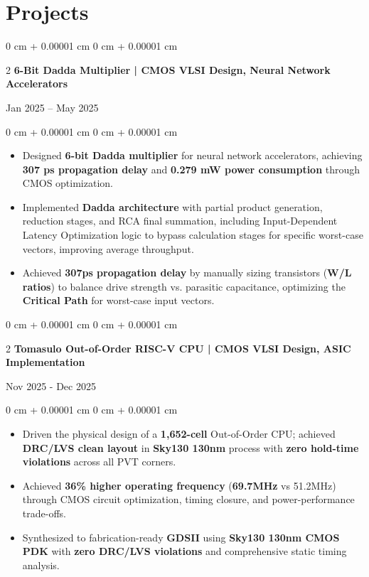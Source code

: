 \documentclass[10pt, letterpaper]{article}
\newenvironment{highlights}{
    \begin{itemize}[
        topsep=0.05 cm,
        parsep=0.05 cm,
        partopsep=0pt,
        itemsep=0pt,
        leftmargin=0 cm + 10pt
    ]
}{
    \end{itemize}
}
\newenvironment{onecolentry}{
    \begin{adjustwidth}{
        0 cm + 0.00001 cm
    }{
        0 cm + 0.00001 cm
    }
}{
    \end{adjustwidth}
}
\newenvironment{twocolentry}[2][]{
    \onecolentry
    \def\secondColumn{#2}
    \setcolumnwidth{\fill, 4.5 cm}
    \begin{paracol}{2}
}{
    \switchcolumn \raggedleft \secondColumn
    \end{paracol}
    \endonecolentry
}
\begin{document}
    \section{Projects}

        \begin{twocolentry}{
            Jan 2025 – May 2025 } \textbf{6-Bit Dadda Multiplier | CMOS VLSI Design, Neural Network Accelerators}
        \end{twocolentry}
        \vspace{0.05 cm}
        \begin{onecolentry}
            \begin{highlights}
                \item Designed \textbf{6-bit Dadda multiplier} for neural network accelerators, achieving \textbf{307 ps propagation delay} and \textbf{0.279 mW power consumption} through CMOS optimization.
                \item Implemented \textbf{Dadda architecture} with partial product generation, reduction stages, and RCA final summation, including Input-Dependent Latency Optimization logic to bypass calculation stages for specific worst-case vectors, improving average throughput.
                \item Achieved \textbf{307ps propagation delay} by manually sizing transistors (\textbf{W/L ratios}) to balance drive strength vs. parasitic capacitance, optimizing the \textbf{Critical Path} for worst-case input vectors.
            \end{highlights}
        \end{onecolentry}

        \vspace{0.10 cm}
        \begin{twocolentry}{
            Nov 2025 - Dec 2025 } \textbf{Tomasulo Out-of-Order RISC-V CPU | CMOS VLSI Design, ASIC Implementation}
        \end{twocolentry}
        \vspace{0.05 cm}
        \begin{onecolentry}
            \begin{highlights}
                \item Driven the physical design of a \textbf{1,652-cell} Out-of-Order CPU; achieved \textbf{DRC/LVS clean layout} in \textbf{Sky130 130nm} process with \textbf{zero hold-time violations} across all PVT corners.
                \item Achieved \textbf{36\% higher operating frequency} (\textbf{69.7MHz} vs 51.2MHz) through CMOS circuit optimization, timing closure, and power-performance trade-offs.
                \item Synthesized to fabrication-ready \textbf{GDSII} using \textbf{Sky130 130nm CMOS PDK} with \textbf{zero DRC/LVS violations} and comprehensive static timing analysis.
            \end{highlights}
        \end{onecolentry}
\end{document}
